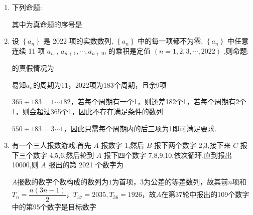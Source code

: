 \begin{enumerate}
\begin{jieda}
        若周期为2，则$x_3 = 1$，$x_2 = 0$或$2$，则$x_4 = 1$，与周期为2矛盾

        因此周期最小时，$x_n$为：$1,1,0,1,1,0,\cdots $
    \end{jieda}
    \item 下列命题:
    其中为真命题的序号是
    \item 设 $\left\{  {a}_{n}\right\}$ 是 2022 项的实数数列, $\left\{  {a}_{n}\right\}$ 中的每一项都不为零, $\left\{  {a}_{n}\right\}$ 中任意连续 11 项 ${a}_{n}$ , ${a}_{n + 1},\cdots ,{a}_{n + {10}}$ 的乘积是定值 $\left( {n = 1,2,3,\cdots ,{2022}}\right)$ ,则命题:
    的真假情况为
    \begin{jieda}
        易知$a_n$的周期为11，$2022$项为$183$个周期，且余9项
        
        $365 \div 183 = 1 \cdots 182$，若每个周期有一个1，则还差182个1，若每个周期有2个1，则会超过365个1，因此不存在满足条件的数列

        $550 \div 183 = 3 \cdots 1$，因此只需每个周期内的后三项为1即可满足要求.
    \end{jieda}
    \item 有一个三人报数游戏:首先 $A$ 报数字 1,然后 $B$ 报下两个数字 2,3,接下来 $C$ 报下三个数字 4,5,6,然后轮到 $A$ 报下四个数字 7,8,9,10,依次循环,直到报出 10000,则 $A$ 报出的第 2021 个数字为
    \begin{jieda}
        $A$报数的数字个数构成的数列为$1$为首项，$3$为公差的等差数列，故其前$n$项和$T_n = \dfrac{n(3n-1)}{2}$，$T_{37} = 2035, T_{36} = 1926$，故$A$在第37轮中报出的109个数字中的第95个数字是目标数字


\end{jieda}
\end{enumerate}
